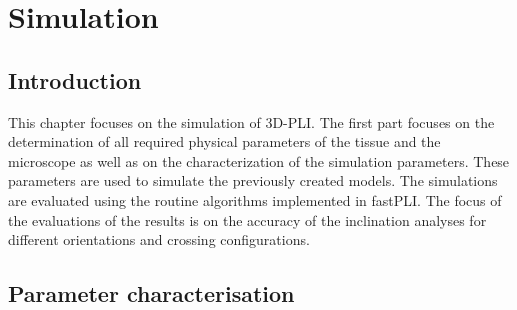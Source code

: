 \setcounter{chapter}{7}
\chapter{Simulation}
\label{cha:simulation_analysis}
%
%
\section{Introduction}
%
This chapter focuses on the simulation of \ac{3D-PLI}.
The first part focuses on the determination of all required physical parameters of the tissue and the microscope as well as on the characterization of the simulation parameters.
These parameters are used to simulate the previously created models.
The simulations are evaluated using the routine algorithms implemented in \ac{fastPLI}.
The focus of the evaluations of the results is on the accuracy of the inclination analyses for different orientations and crossing configurations.
%
%
%
\section{Parameter characterisation}\label{sec:sim_choose_parameters}
%
